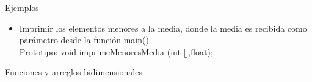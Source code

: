 \documentclass[xcolor=pdftex,table,11pt]{beamer}
\begin{document}
\begin{frame}[allowframebreaks]{Ejemplos}
\begin{enumerate}
\begin{itemize}
	  	 \item Imprimir los elementos menores a la media, donde la media es recibida como parámetro desde la función main()\\
	  Prototipo: void imprimeMenoresMedia (int [],float);
     \end{itemize}

\href{https://github.com/danis963/informaticaI_IUA/blob/main/c/src/5-break_cont_1.c}{}


   \end{enumerate}
   
\end{frame}



\begin{frame}[allowframebreaks]{Funciones y arreglos bidimensionales}
\end{frame}
\end{document}
